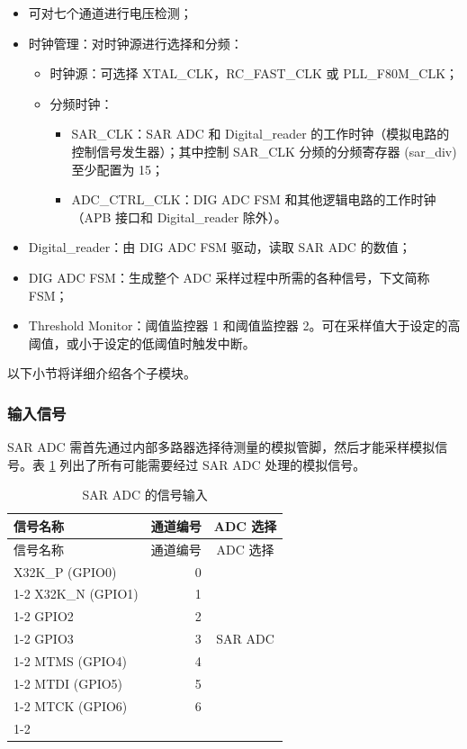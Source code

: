 \documentclass[main\_\_CN.tex]{subfiles}
\begin{document}
\begin{itemize}
    \item 可对七个通道进行电压检测；
    \item 时钟管理：对时钟源进行选择和分频：
        \begin{itemize}
            \item 时钟源：可选择 XTAL\_CLK，RC\_FAST\_CLK 或 PLL\_F80M\_CLK；
            \item 分频时钟：
             \begin{itemize}
                 \item SAR\_CLK：SAR ADC 和 Digital\_reader 的工作时钟（模拟电路的控制信号发生器）；其中控制 SAR\_CLK 分频的分频寄存器 (sar\_div) 至少配置为 15；
                 \item ADC\_CTRL\_CLK：DIG ADC FSM 和其他逻辑电路的工作时钟（APB 接口和 Digital\_reader 除外）。
             \end{itemize}
        \end{itemize}
    \item \label{other:sensor-item-read-data-from-sar-adc} Digital\_reader：由 DIG ADC FSM 驱动，读取 SAR ADC 的数值；
    \item DIG ADC FSM：生成整个 ADC 采样过程中所需的各种信号，下文简称 FSM；
    \item Threshold Monitor：阈值监控器 1 和阈值监控器 2。可在采样值大于设定的高阈值，或小于设定的低阈值时触发中断。
\end{itemize}
以下小节将详细介绍各个子模块。

\subsubsection{输入信号}

SAR ADC 需首先通过内部多路器选择待测量的模拟管脚，然后才能采样模拟信号。表 \ref{tab:sensor-sar-adc-input-signals} 列出了所有可能需要经过 SAR ADC 处理的模拟信号。

\begin{longtable}{ |p{3cm}|r|c| }
    \caption{SAR ADC 的信号输入}
    \label{tab:sensor-sar-adc-input-signals}
    \\\hline
    \rowcolor{lightgray}
    信号名称 & 通道编号  & ADC 选择 \\\hline
    \endfirsthead
    \hline
    \rowcolor{lightgray}   
    信号名称 & 通道编号  & ADC 选择 \\\hline
    \endhead
    \hline
    \endfoot
    X32K\_P (GPIO0)       &  0  & \multirow{7}{*}{SAR ADC} \\ \cline{1-2}
    X32K\_N (GPIO1)       &  1  & \\ \cline{1-2}
    GPIO2         &  2  & \\ \cline{1-2}
    GPIO3         &  3  & \\ \cline{1-2}
    MTMS (GPIO4)          &  4  & \\ \cline{1-2}
    MTDI (GPIO5)          &  5  & \\ \cline{1-2}
    MTCK (GPIO6)          &  6  & \\ \cline{1-2}
\end{longtable}
\end{document}
